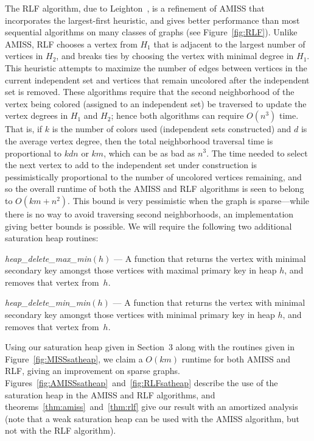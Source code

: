 The RLF algorithm, due 
to Leighton~\cite{LEI1979}, is a refinement of AMISS that incorporates the
largest-first heuristic, and gives better performance than
most sequential algorithms on many classes of graphs (see Figure~\ref{fig:RLF}).
Unlike AMISS, RLF chooses a vertex from $H_1$ that is adjacent to the largest
number of vertices in $H_2$, and breaks ties by choosing the vertex 
with minimal degree in $H_1$. This heuristic attempts to maximize 
the number of edges between vertices in the current independent set and vertices that 
remain uncolored after the independent set is removed.
These algorithms require that the second neighborhood of 
the vertex being colored (assigned to an independent set) be traversed 
to update the vertex degrees in $H_1$ and $H_2$; hence both
algorithms can require $O(n^3)$ time.  That is, if $k$ is the number
of colors used (independent sets constructed) and $d$ is the average 
vertex degree, then the total neighborhood traversal time is
proportional to $kdn$ or $km$, which can be as bad as $n^3$.  The time needed to
select the next vertex to add to the independent set under construction is 
pessimistically proportional to the number of uncolored 
vertices remaining, and so 
the overall runtime of both the AMISS and RLF algorithms is seen to belong to 
$O(km + n^2)$.  This bound 
is very pessimistic when the graph is sparse---while there is no
way to avoid traversing second neighborhoods, an implementation giving better 
bounds is possible.  We will require the following two additional saturation
heap routines:
\begin{list}{}
   {\setlength{\labelwidth}{1.75in}
    \setlength{\leftmargin}{1.75in}
    \setlength{\rightmargin}{0in}
    \setlength{\labelsep}{0in}
   }
\item[{\em heap\_delete\_max\_min\/$(h)$}\hfill]
--- A function that returns the vertex with minimal secondary key amongst those
vertices with maximal primary key in heap $h$, and removes that
vertex from~$h$.
\item[{\em heap\_delete\_min\_min\/$(h)$}\hfill]
--- A function that returns the vertex with minimal secondary key amongst those
vertices with minimal primary key in heap $h$, and removes that
vertex from~$h$.
\end{list}
Using our saturation heap given in Section~3 along with
the routines given in Figure~\ref{fig:MISSsatheap}, we claim a 
$O(km)$ runtime for both AMISS and RLF, giving an improvement on sparse graphs.
Figures~\ref{fig:AMISSsatheap}~and~\ref{fig:RLFsatheap} describe the use 
of the saturation heap in the AMISS and RLF algorithms, and 
theorems~\ref{thm:amiss}~and~\ref{thm:rlf} give our result with an 
amortized analysis (note that a weak saturation heap can be used
with the AMISS algorithm, but not with the RLF algorithm).

